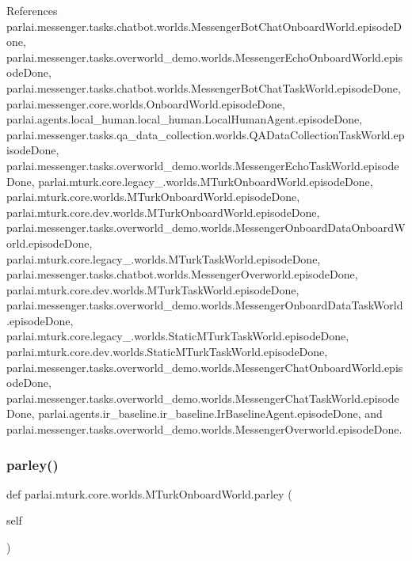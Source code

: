 References parlai.\+messenger.\+tasks.\+chatbot.\+worlds.\+Messenger\+Bot\+Chat\+Onboard\+World.\+episode\+Done, parlai.\+messenger.\+tasks.\+overworld\+\_\+demo.\+worlds.\+Messenger\+Echo\+Onboard\+World.\+episode\+Done, parlai.\+messenger.\+tasks.\+chatbot.\+worlds.\+Messenger\+Bot\+Chat\+Task\+World.\+episode\+Done, parlai.\+messenger.\+core.\+worlds.\+Onboard\+World.\+episode\+Done, parlai.\+agents.\+local\+\_\+human.\+local\+\_\+human.\+Local\+Human\+Agent.\+episode\+Done, parlai.\+messenger.\+tasks.\+qa\+\_\+data\+\_\+collection.\+worlds.\+Q\+A\+Data\+Collection\+Task\+World.\+episode\+Done, parlai.\+messenger.\+tasks.\+overworld\+\_\+demo.\+worlds.\+Messenger\+Echo\+Task\+World.\+episode\+Done, parlai.\+mturk.\+core.\+legacy\+\_.\+worlds.\+M\+Turk\+Onboard\+World.\+episode\+Done, parlai.\+mturk.\+core.\+worlds.\+M\+Turk\+Onboard\+World.\+episode\+Done, parlai.\+mturk.\+core.\+dev.\+worlds.\+M\+Turk\+Onboard\+World.\+episode\+Done, parlai.\+messenger.\+tasks.\+overworld\+\_\+demo.\+worlds.\+Messenger\+Onboard\+Data\+Onboard\+World.\+episode\+Done, parlai.\+mturk.\+core.\+legacy\+\_.\+worlds.\+M\+Turk\+Task\+World.\+episode\+Done, parlai.\+messenger.\+tasks.\+chatbot.\+worlds.\+Messenger\+Overworld.\+episode\+Done, parlai.\+mturk.\+core.\+dev.\+worlds.\+M\+Turk\+Task\+World.\+episode\+Done, parlai.\+messenger.\+tasks.\+overworld\+\_\+demo.\+worlds.\+Messenger\+Onboard\+Data\+Task\+World.\+episode\+Done, parlai.\+mturk.\+core.\+legacy\+\_.\+worlds.\+Static\+M\+Turk\+Task\+World.\+episode\+Done, parlai.\+mturk.\+core.\+dev.\+worlds.\+Static\+M\+Turk\+Task\+World.\+episode\+Done, parlai.\+messenger.\+tasks.\+overworld\+\_\+demo.\+worlds.\+Messenger\+Chat\+Onboard\+World.\+episode\+Done, parlai.\+messenger.\+tasks.\+overworld\+\_\+demo.\+worlds.\+Messenger\+Chat\+Task\+World.\+episode\+Done, parlai.\+agents.\+ir\+\_\+baseline.\+ir\+\_\+baseline.\+Ir\+Baseline\+Agent.\+episode\+Done, and parlai.\+messenger.\+tasks.\+overworld\+\_\+demo.\+worlds.\+Messenger\+Overworld.\+episode\+Done.

\mbox{\label{classparlai_1_1mturk_1_1core_1_1worlds_1_1MTurkOnboardWorld_ae3f1437a7012ea16489f4c004c420fe6}} 
\subsubsection{\texorpdfstring{parley()}{parley()}}
{\footnotesize\ttfamily def parlai.\+mturk.\+core.\+worlds.\+M\+Turk\+Onboard\+World.\+parley (\begin{DoxyParamCaption}\item[{}]{self }\end{DoxyParamCaption})}

